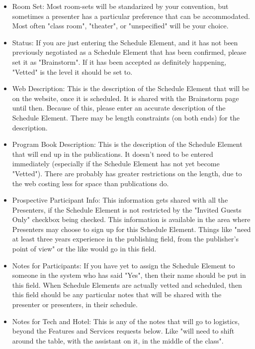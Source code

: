 \documentclass[captions=tablesignature]{scrartcl}
\begin{document}
\begin{itemize}
\item Room Set: Most room-sets will be standarized by your convention,
but sometimes a presenter has a particular preference that can
be accommodated.  Most often "class room", "theater", or
"unspecified" will be your choice.

\item Status: If you are just entering the Schedule Element, and it has
not been previously negotiated as a Schedule Element that has
been confirmed, please set it as "Brainstorm".  If it has been
accepted as definitely happening, "Vetted" is the level it should
be set to.

\item Web Description: This is the description of the Schedule Element
that will be on the website, once it is scheduled. It is shared
with the Brainstorm page until then. Because of this, please
enter an accurate description of the Schedule Element.  There may
be length constraints (on both ends) for the description.

\item Program Book Description: This is the description of the Schedule
Element that will end up in the publications.  It doesn't need to
be entered immediately (especially if the Schedule Element has
not yet become "Vetted"). There are probably has greater
restrictions on the length, due to the web costing less for space
than publications do.

\item Prospective Participant Info: This information gets shared with
all the Presenters, if the Schedule Element is not restricted by
the "Invited Guests Only" checkbox being checked.  This
information is available in the area where Presenters may choose
to sign up for this Schedule Element.  Things like "need at least
three years experience in the publishing field, from the
publisher's point of view" or the like would go in this field.

\item Notes for Participants: If you have yet to assign the Schedule
Element to someone in the system who has said "Yes", then their
name should be put in this field.  When Schedule Elements are
actually vetted and scheduled, then this field should be any
particular notes that will be shared with the presenter or
presenters, in their schedule.

\item Notes for Tech and Hotel: This is any of the notes that will go
to logistics, beyond the Features and Services requests below.
Like "will need to shift around the table, with the assistant on
it, in the middle of the class".


\end{itemize}
\end{document}
